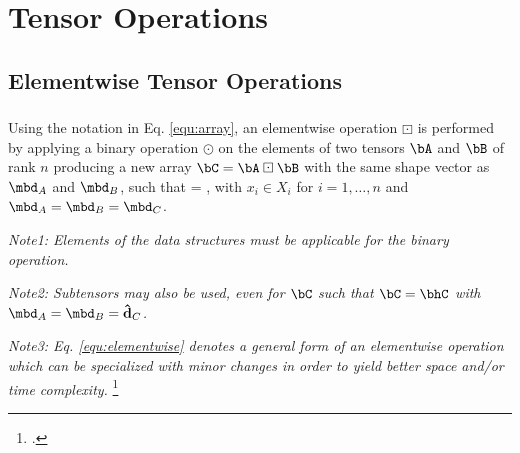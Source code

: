\section{Tensor Operations}

\subsection{Elementwise Tensor Operations}
\begin{frame}
\frametitle{}
\begin{Definition}
\label{def:elementwise}
Using the notation in Eq. \eqref{equ:array}, an elementwise operation $\boxdot$ is performed by applying a binary operation $\odot$ on the elements of two tensors $\bA$ and $\bB$ of rank $n$ producing a new array $\bC = \bA \boxdot \bB$ with the same shape vector as $\mbd_{A}$ and $\mbd_{B}$, such that
\be\label{equ:elementwise}
\bC[x_1,\dots,x_n] = \bA[x_1,\dots,x_n] \odot \bB[x_1,\dots,x_n],
\ee
with $x_i \in X_i$ for $i = 1,\dots,n$ and $\mbd_{A} = \mbd_{B} = \mbd_{C}$. 
\end{Definition}
\vfill

\emph{Note1: Elements of the data structures must be applicable for the binary operation.}\newline

\emph{Note2: Subtensors may also be used, even for $\bC$ such that $\bC = \bhC$ with $\mbd_{A} = \mbd_{B} = \mathbf{{\hat{d}}}_{C}$.}\newline

\emph{Note3: Eq. \eqref{equ:elementwise} denotes a general form of an elementwise operation which can be specialized with minor changes in order to yield better space and/or time complexity.}
\footcitetext{Bader:2006:Algorithm862}
\end{frame}

